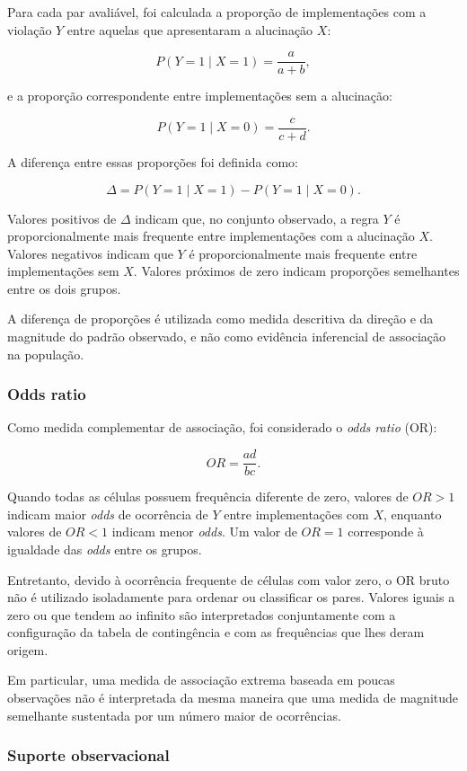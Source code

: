 Para cada par avaliável, foi calculada a proporção de implementações com a violação $Y$ entre aquelas que apresentaram a alucinação $X$:

\[
P(Y=1\mid X=1)
=
\frac{a}{a+b},
\]

e a proporção correspondente entre implementações sem a alucinação:

\[
P(Y=1\mid X=0)
=
\frac{c}{c+d}.
\]

A diferença entre essas proporções foi definida como:

\[
\Delta =
P(Y=1\mid X=1)
-
P(Y=1\mid X=0).
\]

Valores positivos de $\Delta$ indicam que, no conjunto observado, a regra $Y$ é proporcionalmente mais frequente entre implementações com a alucinação $X$. Valores negativos indicam que $Y$ é proporcionalmente mais frequente entre implementações sem $X$. Valores próximos de zero indicam proporções semelhantes entre os dois grupos.

A diferença de proporções é utilizada como medida descritiva da direção e da magnitude do padrão observado, e não como evidência inferencial de associação na população.

\subsubsection{Odds ratio}

Como medida complementar de associação, foi considerado o \textit{odds ratio} (OR):

\[
OR=\frac{ad}{bc}.
\]

Quando todas as células possuem frequência diferente de zero, valores de $OR>1$ indicam maior \textit{odds} de ocorrência de $Y$ entre implementações com $X$, enquanto valores de $OR<1$ indicam menor \textit{odds}. Um valor de $OR=1$ corresponde à igualdade das \textit{odds} entre os grupos.

Entretanto, devido à ocorrência frequente de células com valor zero, o OR bruto não é utilizado isoladamente para ordenar ou classificar os pares. Valores iguais a zero ou que tendem ao infinito são interpretados conjuntamente com a configuração da tabela de contingência e com as frequências que lhes deram origem.

Em particular, uma medida de associação extrema baseada em poucas observações não é interpretada da mesma maneira que uma medida de magnitude semelhante sustentada por um número maior de ocorrências.

\subsubsection{Suporte observacional}

